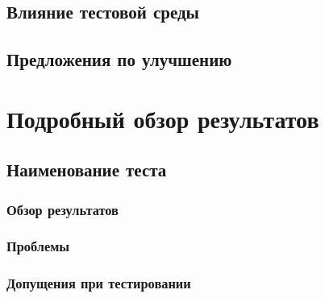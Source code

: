 \documentclass[a4paper, 12pt]{article}
\begin{document}

\subsection{Влияние тестовой среды} %


\subsection{Предложения по улучшению} %



\section{Подробный обзор результатов}

\subsection{Наименование теста} %

\subsubsection{Обзор результатов} %

\subsubsection{Проблемы} %

\subsubsection{Допущения при тестировании} %


\end{document}
